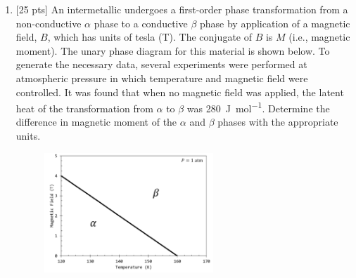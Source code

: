 
\DeclareSIUnit{}





\pagebreak

\begin{enumerate}
  \item {[25 pts]} An intermetallic undergoes a first-order phase
    transformation from a non-conductive $\alpha$
    phase to a conductive $\beta$ phase by application of a magnetic
    field, $B$, which has units of tesla (T). The
    conjugate of $B$ is $M$ (i.e., magnetic moment). The unary phase
    diagram for this material is shown
    below. To generate the necessary data, several experiments were
    performed at atmospheric pressure in
    which temperature and magnetic field were controlled. It was
    found that when no magnetic field was
    applied, the latent heat of the transformation from $\alpha$ to
    $\beta$ was \SI{280}{\joule\per\mole}. Determine the difference in
    magnetic moment of the $\alpha$ and $\beta$ phases with the
    appropriate units.

    \begin{figure}[h]
      \centering
      \includegraphics[width=0.6\textwidth]{./assets/fig_1.png}
    \end{figure}

    \pagebreak


\end{enumerate}
